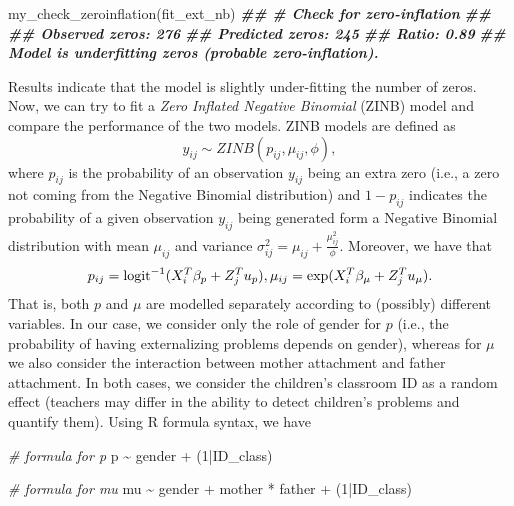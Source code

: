 \documentclass[
]{book}
\newenvironment{Shaded}{\begin{snugshade}}{\end{snugshade}}
\newcommand{\CommentTok}[1]{\textcolor[rgb]{0.56,0.35,0.01}{\textit{#1}}}
\newcommand{\DecValTok}[1]{\textcolor[rgb]{0.00,0.00,0.81}{#1}}
\newcommand{\DocumentationTok}[1]{\textcolor[rgb]{0.56,0.35,0.01}{\textbf{\textit{#1}}}}
\newcommand{\FunctionTok}[1]{\textcolor[rgb]{0.00,0.00,0.00}{#1}}
\newcommand{\NormalTok}[1]{#1}
\newcommand{\SpecialCharTok}[1]{\textcolor[rgb]{0.00,0.00,0.00}{#1}}
\begin{document}
\begin{Shaded}
\begin{Highlighting}[]
\FunctionTok{my\_check\_zeroinflation}\NormalTok{(fit\_ext\_nb)}
\DocumentationTok{\#\# \# Check for zero{-}inflation}
\DocumentationTok{\#\# }
\DocumentationTok{\#\#    Observed zeros: 276}
\DocumentationTok{\#\#   Predicted zeros: 245}
\DocumentationTok{\#\#             Ratio: 0.89}
\DocumentationTok{\#\# Model is underfitting zeros (probable zero{-}inflation).}
\end{Highlighting}
\end{Shaded}

Results indicate that the model is slightly under-fitting the number of zeros. Now, we can try to fit a \emph{Zero Inflated Negative Binomial} (ZINB) model and compare the performance of the two models. ZINB models are defined as
\[
y_{ij} \sim ZINB(p_{ij}, \mu_{ij}, \phi),
\]
where \(p_{ij}\) is the probability of an observation \(y_{ij}\) being an extra zero (i.e., a zero not coming from the Negative Binomial distribution) and \(1-p_{ij}\) indicates the probability of a given observation \(y_{ij}\) being generated form a Negative Binomial distribution with mean \(\mu_{ij}\) and variance \(\sigma_{ij}^2 = \mu_{ij} + \frac{\mu_{ij}^2}{\phi}\). Moreover, we have that
\[
p_{ij} = \text{logit}^{-1}(X_i^T\beta_p+ Z_j^Tu_p),\\
\mu_{ij} = \text{exp}(X_i^T\beta_{\mu}+ Z_j^Tu_{\mu}).
\]
That is, both \(p\) and \(\mu\) are modelled separately according to (possibly) different variables. In our case, we consider only the role of gender for \(p\) (i.e., the probability of having externalizing problems depends on gender), whereas for \(\mu\) we also consider the interaction between mother attachment and father attachment. In both cases, we consider the children's classroom ID as a random effect (teachers may differ in the ability to detect children's problems and quantify them). Using R formula syntax, we have

\begin{Shaded}
\begin{Highlighting}[]
\CommentTok{\# formula for p}
\NormalTok{p }\SpecialCharTok{\textasciitilde{}}\NormalTok{ gender }\SpecialCharTok{+}\NormalTok{ (}\DecValTok{1}\SpecialCharTok{|}\NormalTok{ID\_class)}

\CommentTok{\# formula for mu}
\NormalTok{mu }\SpecialCharTok{\textasciitilde{}}\NormalTok{ gender }\SpecialCharTok{+}\NormalTok{ mother }\SpecialCharTok{*}\NormalTok{ father }\SpecialCharTok{+}\NormalTok{ (}\DecValTok{1}\SpecialCharTok{|}\NormalTok{ID\_class)}
\end{Highlighting}
\end{Shaded}
\end{document}
